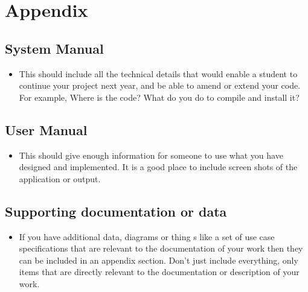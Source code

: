 \section{Appendix}
\label{sec:appendix}

\subsection{System Manual}

\begin{mdframed}
	\begin{itemize}
		\item This should include all the technical details that would enable a
		student to continue your project next year, and be able to amend or extend
		your code. For example, Where is the code? What do you do to compile and
		install it?
	\end{itemize}
\end{mdframed}

\subsection{User Manual}

\begin{mdframed}
	\begin{itemize}
		\item This should give enough information for someone to use what you have
		designed and implemented. It is a good place to include screen shots of the
		application or output.
	\end{itemize}
\end{mdframed}

\subsection{Supporting documentation or data}

\begin{mdframed}
	\begin{itemize}
		\item If you have additional data, diagrams or thing s like a set of use
		case specifications that are relevant to the documentation of your work then
		they can be included in an appendix section. Don't just include everything,
		only items that are directly relevant to the documentation or description of
		your work.
	\end{itemize}
\end{mdframed}

